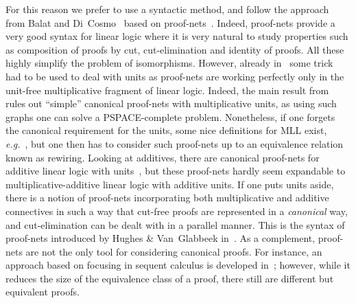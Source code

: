 \documentclass{lmcs}
\newcommand*{\eg}{\emph{e.g.}}
\begin{document}
For this reason we prefer to use a syntactic method, and follow the approach from Balat and Di~Cosmo~\cite{mllisos} based on proof-nets~\cite{pn}.
Indeed, proof-nets provide a very good syntax for linear logic where it is very natural to study properties such as composition of proofs by cut, cut-elimination and identity of proofs.
All these highly simplify the problem of isomorphisms.
However, already in~\cite{mllisos} some trick had to be used to deal with units as proof-nets are working perfectly only in the unit-free multiplicative fragment of linear logic.
Indeed, the main result from~\cite{mllpnpspace} rules out ``simple'' canonical proof-nets with multiplicative units, as using such graphs one can solve a PSPACE-complete problem.
Nonetheless, if one forgets the canonical requirement for the units, some nice definitions for MLL exist, \eg~\cite{cohweakdistrcat,hughes*cat}, but one then has to consider such proof-nets up to an equivalence relation known as rewiring.
Looking at additives, there are canonical proof-nets for additive linear logic with units~\cite{allpn}, but these proof-nets hardly seem expandable to multiplicative-additive linear logic with additive units.
If one puts units aside, there is a notion of proof-nets incorporating both multiplicative and additive connectives in such a way that cut-free proofs are represented in a \emph{canonical} way, and cut-elimination can be dealt with in a parallel manner.
This is the syntax of proof-nets introduced by Hughes \& Van~Glabbeek in~\cite{mallpnlong}.
As a complement, proof-nets are not the only tool for considering canonical proofs.
For instance, an approach based on focusing in sequent calculus is developed in~\cite{canonicmultifoc}; however, while it reduces the size of the equivalence class of a proof, there still are different but equivalent proofs.
\end{document}

